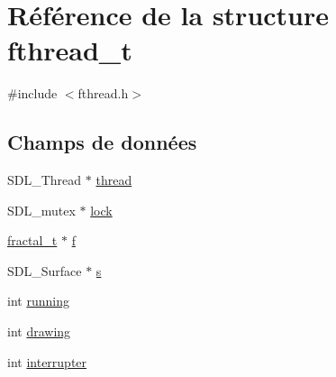 \hypertarget{structfthread__t}{\section{\-Référence de la structure fthread\-\_\-t}
\label{structfthread__t}
}


{\ttfamily \#include $<$fthread.\-h$>$}

\subsection*{\-Champs de données}
\begin{DoxyCompactItemize}
\item 
\-S\-D\-L\-\_\-\-Thread $\ast$ \hyperlink{structfthread__t_a015a1b2637e8ef1d7316307ba3b4a245}{thread}
\item 
\-S\-D\-L\-\_\-mutex $\ast$ \hyperlink{structfthread__t_a08a1c07dac85a5e5627314400573b29a}{lock}
\item 
\hyperlink{fconfig_8h_a34e2540dddf3af178196811c6a45cbe0}{fractal\-\_\-t} $\ast$ \hyperlink{structfthread__t_ad66de094ec352eca5bc2ce15931ee752}{f}
\item 
\-S\-D\-L\-\_\-\-Surface $\ast$ \hyperlink{structfthread__t_a6d86e21267930a240426853ab443245b}{s}
\item 
int \hyperlink{structfthread__t_aa634e730b851175842d36df4cc04bd2b}{running}
\item 
int \hyperlink{structfthread__t_a7fbee2fd4f87ca64bd6018eac296a42d}{drawing}
\item 
int \hyperlink{structfthread__t_aeb3200e557bbf08131983b5490eb3a18}{interrupter}
\end{DoxyCompactItemize}


